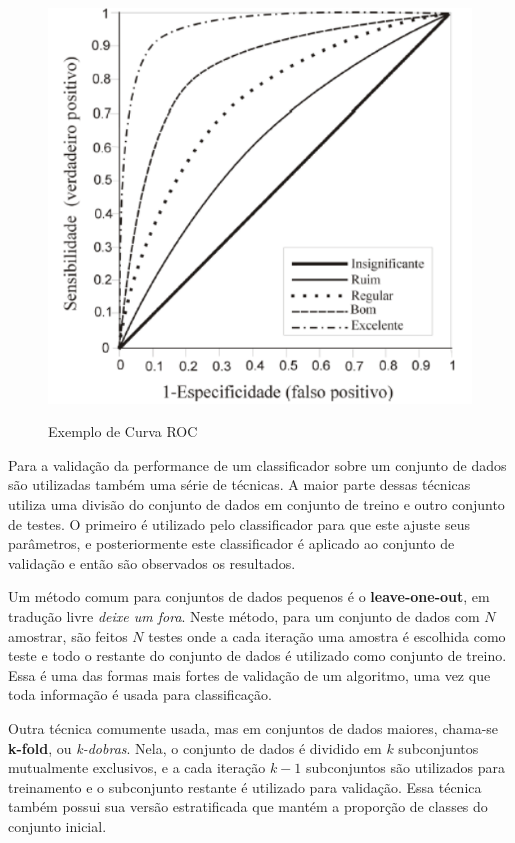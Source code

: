 \begin{figure}[htb]
	\centering
    \caption{Exemplo de Curva ROC}
    \includegraphics[scale=0.5]{images/curva-roc-exemplo.png}
    \label{fig:metodologia:curva-roc-exemplo}
\end{figure}

Para a validação da performance de um classificador sobre um conjunto de dados são utilizadas também uma série de técnicas. A maior parte dessas técnicas utiliza uma divisão do conjunto de dados em conjunto de treino e outro conjunto de testes. O primeiro é utilizado pelo classificador para que este ajuste seus parâmetros, e posteriormente este classificador é aplicado ao conjunto de validação e então são observados os resultados.

Um método comum para conjuntos de dados pequenos é o \textbf{leave-one-out}, em tradução livre \textit{deixe um fora}. Neste método, para um conjunto de dados com $N$ amostrar, são feitos $N$ testes onde a cada iteração uma amostra é escolhida como teste e todo o restante do conjunto de dados é utilizado como conjunto de treino. Essa é uma das formas mais fortes de validação de um algoritmo, uma vez que toda informação é usada para classificação.

Outra técnica comumente usada, mas em conjuntos de dados maiores, chama-se \textbf{k-fold}, ou \textit{k-dobras}. Nela, o conjunto de dados é dividido em $k$ subconjuntos mutualmente exclusivos, e a cada iteração $k-1$ subconjuntos são utilizados para treinamento e o subconjunto restante é utilizado para validação. Essa técnica também possui sua versão estratificada que mantém a proporção de classes do conjunto inicial.

